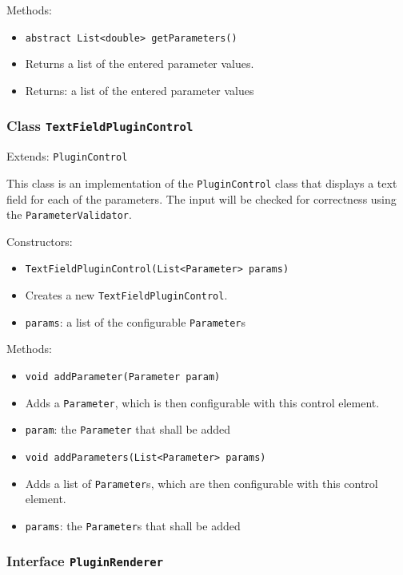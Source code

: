 \documentclass[parskip=full,11pt]{scrartcl}
\begin{document}
Methods:

\begin{itemize}\itemsep -10pt
	\item \texttt{abstract List<double> getParameters()}
	\item[] Returns a list of the entered parameter values.
	\item[] Returns: a list of the entered parameter values
\end{itemize}

\subsubsection{Class \texttt{TextFieldPluginControl}}
Extends: \texttt{PluginControl}

This class is an implementation of the \texttt{PluginControl} class that displays a text field for each of the parameters. The input will be checked for correctness using the \texttt{ParameterValidator}.

Constructors:

\begin{itemize}\itemsep -10pt
	\item \texttt{TextFieldPluginControl(List<Parameter> params)}
	\item[] Creates a new \texttt{TextFieldPluginControl}.
	\item[] \texttt{params}: a list of the configurable \texttt{Parameter}s
\end{itemize}

Methods:

\begin{itemize}\itemsep -10pt
	\item \texttt{void addParameter(Parameter param)}
	\item[] Adds a \texttt{Parameter}, which is then configurable with this control element.
	\item[] \texttt{param}: the \texttt{Parameter} that shall be added
	\item \texttt{void addParameters(List<Parameter> params)}
	\item[] Adds a list of \texttt{Parameter}s, which are then configurable with this control element.
	\item[] \texttt{params}: the \texttt{Parameter}s that shall be added
\end{itemize}

\subsubsection{Interface \texttt{PluginRenderer}}
\end{document}
